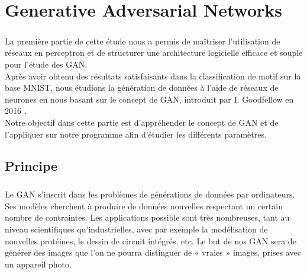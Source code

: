 

%

\chapter{Generative Adversarial Networks}

\paragraph{}
	La première partie de cette étude nous a permis de maîtriser l'utilisation de réseaux en perceptron et de structurer une architecture logicielle efficace et souple pour l'étude des GAN. \\
	Après avoir obtenu des résultats satisfaisants dans la classification de motif sur la base MNIST, nous étudions la génération de données à l'aide de réseaux de neurones en nous basant sur le concept de GAN, introduit par I. Goodfellow en 2016 \cite{nips-2014}.\\
	Notre objectif dans cette partie est d’appréhender le concept de GAN et de l'appliquer sur notre programme afin d'étudier les différents paramètres. 
\section{Principe}
	\paragraph{}
		Le GAN s'inscrit dans les problèmes de générations de données par ordinateurs. Ses modèles cherchent à produire de données nouvelles respectant un certain nombre de contraintes. Les applications possible sont très nombreuses, tant au niveau scientifiques qu'industrielles, avec par exemple la modélisation de nouvelles protéines, le dessin de circuit intégrés, etc. 
		Le but de nos GAN sera de générer des images que l’on ne pourra distinguer de « vraies » images, prises avec un appareil photo.\\

